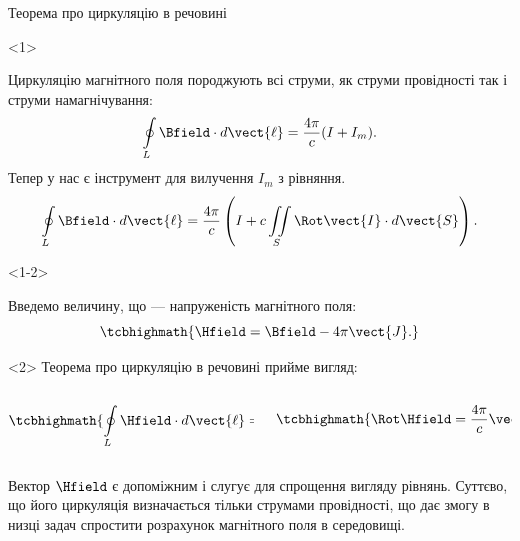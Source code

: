\documentclass{beamer}
\begin{document}




\begin{frame}{Теорема про циркуляцію в речовині}{}
	\begin{onlyenv}
		\begin{block}{}\justifying
			Циркуляцію магнітного поля породжують всі струми, як струми провідності так і струми намагнічування:
			\begin{equation*}
				\oint\limits_L\Bfield\cdot d\vect{\ell} = \frac{4\pi}c(I + I_m).
			\end{equation*}
			Тепер у нас є інструмент для вилучення $I_m$ з рівняння.
			\begin{equation*}
				\oint\limits_L\Bfield\cdot d\vect{\ell} = \frac{4\pi}c\left(I + c
				\iint\limits_S \Rot\vect{I}\cdot d\vect{S}\right).
			\end{equation*}
		\end{block}
	\end{onlyenv}
	\begin{onlyenv}<1-2>
		\begin{block}{}\justifying
			Введемо величину, що --- \alert{напруженість магнітного поля}:
			\begin{equation*}
				\tcbhighmath{\Hfield = \Bfield - 4\pi\vect{J}.}
			\end{equation*}
		\end{block}
	\end{onlyenv}
	\begin{onlyenv}
		Теорема про циркуляцію в речовині прийме вигляд:
		\begin{columns}
			\begin{column}{0.5\linewidth}\centering
				\begin{equation*}
					\tcbhighmath{\oint\limits_L\Hfield\cdot d\vect{\ell} = \frac{4\pi}cI.}
				\end{equation*}
			\end{column}
			\begin{column}{0.5\linewidth}\centering
				\begin{equation*}
					\tcbhighmath{\Rot\Hfield = \frac{4\pi}c\vect{j}.}
				\end{equation*}
			\end{column}
		\end{columns}
		\begin{block}{}\justifying
			Вектор $\Hfield$ є допоміжним і слугує для спрощення вигляду рівнянь. Суттєво, що \alert{його циркуляція визначається тільки струмами провідності},
			що дає змогу в низці задач спростити розрахунок магнітного поля в середовищі.
		\end{block}
	\end{onlyenv}
\end{frame}
\end{document}

